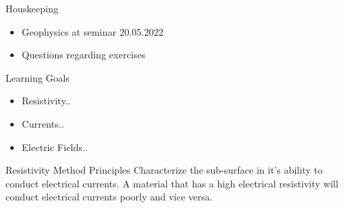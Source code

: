 \begin{frame}
  \begin{PointSix}{Houskeeping}
    \begin{itemize}
      \item \alert{Geophysics at seminar 20.05.2022}
      \item \alert{Questions regarding exercises}
    \end{itemize}
  \end{PointSix}
\end{frame}

\begin{frame}
  \begin{PointSix}{Learning Goals}
    \begin{itemize}
      \item \alert{Resistivity..}
      \item \alert{Currents..}
      \item \alert{Electric Fields..}
    \end{itemize}
  \end{PointSix}
\end{frame}

\begin{frame}
  \begin{PointSix}{Resistivity Method Principles}
      \small
      Characterize the sub-surface in it's ability to conduct electrical currents. A material that has a high electrical resistivity will conduct electrical currents poorly and vice versa.
  \end{PointSix}
\end{frame}

